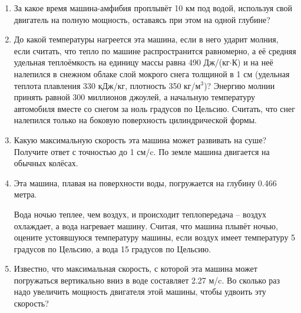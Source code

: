 \begin{enumerate}
    \item За какое время машина-амфибия проплывёт 10 км под водой, используя свой двигатель на полную мощность, 
    оставаясь при этом на одной глубине? 
    \item До какой температуры нагреется эта машина, если в него ударит молния, если считать, что тепло по машине 
    распространится равномерно, а её средняя удельная теплоёмкость на единицу массы равна 490 Дж/(кг$\cdot$К) и на 
    неё налепился в снежном облаке слой мокрого снега толщиной в 1 см (удельная теплота плавления 330 кДж/кг, 
    плотность 350 кг/м$^3$)?  Энергию молнии принять равной 300 миллионов джоулей, а начальную температуру 
    автомобиля вместе со снегом за ноль градусов по Цельсию. Считать, что снег налепился только на боковую 
    поверхность цилиндрической формы.
    \item Какую максимальную скорость эта машина может развивать на суше? Получите ответ с точностью до 1 см/c. По 
    земле машина двигается на обычных колёсах.
    \item Эта машина, плавая на поверхности воды, погружается на глубину 0.466 метра.
    

    Вода ночью теплее, чем воздух, и происходит теплопередача – воздух охлаждает, а вода нагревает машину. 
    Считая, что машина плывёт ночью, оцените устоявшуюся температуру машины, если воздух имеет температуру 5 
    градусов по Цельсию, а вода 15 градусов по Цельсию.
    \item Известно, что максимальная скорость, с которой эта машина может погружаться вертикально вниз в воде 
    составляет 2.27 м/c. Во сколько раз надо увеличить мощность двигателя этой машины, чтобы удвоить эту скорость?
\end{enumerate}